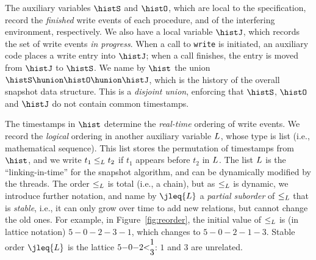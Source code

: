 The auxiliary variables $\histS$ and $\histO$, which are local to the
specification, record the \emph{finished} write events of each
procedure, and of the interfering environment, respectively.  We also
have a local variable $\histJ$, which records the set of write events
\emph{in progress}. When a call to {\tt write} is initiated, an
auxiliary code places a write entry into $\histJ$; when a call
finishes, the entry is moved from $\histJ$ to $\histS$.
%
%
We name by $\hist$ the union $\histS \hunion \histO \hunion \histJ$,
which is the history of the overall snapshot data structure. This is a
\emph{disjoint union}, enforcing that $\histS$, $\histO$ and $\histJ$
do not contain common timestamps.

The timestamps in $\hist$ determine the \emph{real-time} ordering of
write events. We record the \emph{logical} ordering in another
auxiliary variable $L$, whose type is list (i.e., mathematical
sequence). This list stores the permutation of timestamps from
$\hist$, and we write $t_1 \mathrel{\leq_L} t_2$ if $t_1$ appears before $t_2$ in
$L$. The list $L$ is the ``linking-in-time'' for the
snapshot algorithm, and can be dynamically modified by the threads.
%
%
The order $\mathrel{\leq_L}$ is total (i.e., a chain), but as $\mathrel{\leq_L}$ is dynamic,
we introduce further notation, and name by $\jleq{\ordlist}$ a \emph{partial
  suborder} of $\mathrel{\leq_L}$ that is \emph{stable}, i.e., it can only grow
over time to add new relations, but cannot change the old ones. 
%
For example, in Figure~\ref{fig:reorder}, the initial value of $\mathrel{\leq_L}$ is
(in lattice notation) $5{-}0{-}2{-}3{-}1$, which changes to $5{-}0{-}2{-}1{-}3$. Stable
order $\jleq{\ordlist}$ is the lattice
$5{-}0{-}2{<}\!\!\!\begin{array}[c]{c}1\\ 3\end{array}\!\!\!$: $1$ and $3$ are unrelated.

